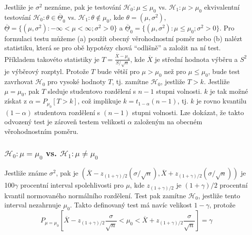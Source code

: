 Jestliže je $\sigma^2$ neznáme, pak je testování $\mathscr{H}_0: \mu \le \mu_0$ vs. $\mathscr{H}_1: \mu > \mu_0$ ekvivalentní testování $\mathscr{H}_0: \theta \in \overline{\underline{\Theta}}_0$ vs. $\mathscr{H}_1: \theta \notin \mu_0$, kde $\theta = (\mu, \sigma^2)$, $\overline{\underline{\Theta}} = \{(\mu, \sigma^2): -\infty < \mu < \infty; \sigma^2 > 0\}$  a $\overline{\underline{\Theta}}_0 = \{(\mu, \sigma^2): \mu \le \mu_0; \sigma^2 > 0\}$. Pro formulaci testu můžeme (a) použít obecný věrohodnostní poměr nebo (b) nalézt statistiku, která se pro obě hypotézy chová ``odlišně'' a založit na ní test. Příkladem takovéto statistiky je $T = \frac{\overline{X} - \mu_0}{S / \sqrt{n}}$, kde $\overline{X}$ je střední hodnota výběru a $S^2$ je výběrový rozptyl. Protože $T$ bude větší pro $\mu > \mu_0$ než pro $\mu \le \mu_0$, bude test zavrhovat $\mathscr{H}_0$ pro vysoké hodnoty $T$, tj. zamítne $\mathscr{H}_0$, jestliže $T > k$. Jestliže $\mu = \mu_0$, pak $T$ sleduje studentovo rozdělení s $n - 1$ stupni volnosti. $k$ je tak možné získat z $\alpha = P_{\mu_0}[T > k]$, což implikuje $k = t_{1 - \alpha}(n-1)$, tj. $k$ je rovno kvantilu $(1 - \alpha)$ studentova rozdělení s $(n - 1)$ stupni volnosti. Lze dokázat, že takto odvozený test je zároveň testem velikosti $\alpha$ založeným na obecném věrohodnostním poměru.

\subsubsection{$\mathscr{H}_0: \mu = \mu_0$ vs. $\mathscr{H}_1: \mu \neq \mu_0$}

Jestliže známe $\sigma^2$, pak je $\left(\overline{X} - z_{(1 + \gamma)/2}(\sigma / \sqrt{n}), \overline{X} + z_{(1 + \gamma)/2}(\sigma / \sqrt{n})\right)$ je 100$\gamma$ procentní interval spolehlivosti pro $\mu$, kde $z_{(1 + \gamma)/2}$ je $(1 + \gamma)/2$ procentní kvantil normovaného normálního rozdělení. Test pak zamítne $\mathscr{H}_0$, jestliže tento interval nezahrnuje $\mu_0$. Takto definovaný test má navíc velikost $1 - \gamma$, protože
\begin{equation*}
P_{\mu = \mu_0}\left[\overline{X} - z_{(1 + \gamma)/2}\frac{\sigma}{\sqrt{n}} < \mu_0 < \overline{X} + z_{(1 + \gamma)/ 2} \frac{\sigma}{\sqrt{n}}\right] = \gamma
\end{equation*}

